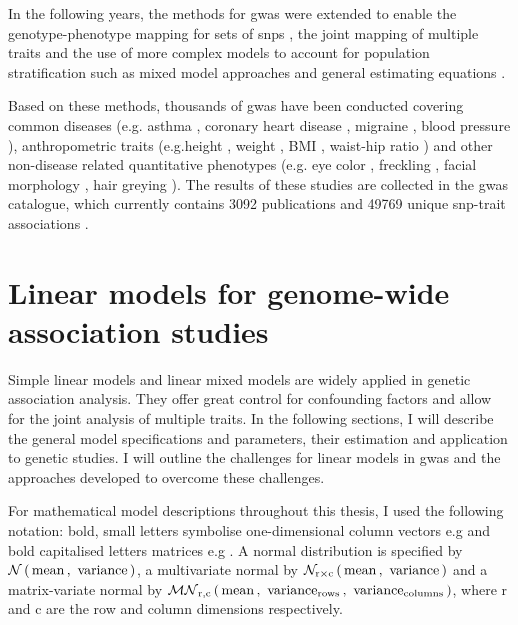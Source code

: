 In the following years, the methods for \gls{gwas} were extended to enable the genotype-phenotype mapping for sets of \glspl{snp}  \citep{Wu2010,Casale2015}, the joint mapping of multiple traits \citep{Korte2012,Yang2011,Bottolo2013,Casale2015} and the use of more complex models to account for population stratification such as mixed model approaches \citep{Kang2010,Lippert2011,Zhang2010,Svishcheva2012} and general estimating equations \citep{Cupples2007}.

Based on these methods, thousands of \gls{gwas} have been conducted covering common diseases (e.g. asthma \citep{Noguchi2011,Pickrell2016}, coronary heart disease \citep{Wild2011,Takeuchi2012,Lu2012}, migraine \citep{Pickrell2016,Gormley2016}, blood pressure \citep{Kato2011,Franceschini2013}), anthropometric traits (e.g.height \citep{Lango2010,Wood2014}, weight \citep{Willer2009}, BMI \citep{Speliotes2010,Yang2012a}, waist-hip ratio \citep{Lindgren2009,Heid2010}) and other non-disease related quantitative phenotypes (e.g. eye color \citep{Eriksson2010,Candille2012,Zhang2013}, freckling \citep{Sulem2008}, facial morphology \citep{Paternoster2012}, hair greying \citep{Adhikari2016}). The results of these studies are collected in the \gls{gwas} catalogue, which currently contains \num{3092} publications and \num{49769} unique \gls{snp}-trait associations \citep[accessed 10.09.2017]{MacArthur2017}. 


\section{Linear models for genome-wide association studies}
\label{section:LinearModels}
Simple linear models and linear mixed models are widely applied in genetic association analysis. They offer great control for confounding factors and allow for the joint analysis of multiple traits. In the following sections, I will describe the general model specifications and parameters, their estimation and application to genetic studies. I will outline the challenges for linear models in \gls{gwas} and the approaches developed to overcome these challenges. 

For mathematical model descriptions throughout this thesis, I used the following notation: bold, small letters symbolise one-dimensional column vectors e.g  and bold capitalised letters matrices e.g . A normal distribution is specified by \(\mathcal{N}\left(\,{\text{mean}}\,,~{\text{variance}}\,\right)\), a multivariate normal by \(\mathcal{N}_{\text{r}\times \text{c}}\left(\, {\text{mean}} \,,~{\text{variance}} \,\right)\) and a matrix-variate normal by  \(\mathcal{MN}_{\text{r},\text{c}}\left(\, \boldsymbol{\mathbf{{\text{mean}}}} \,,~\boldsymbol{\mathbf{{\text{variance}_\text{rows}}}}\,,~\boldsymbol{\mathbf{{\text{variance}_{\text{columns}}}}} \,\right)\), where r and c are the row and column dimensions respectively.

